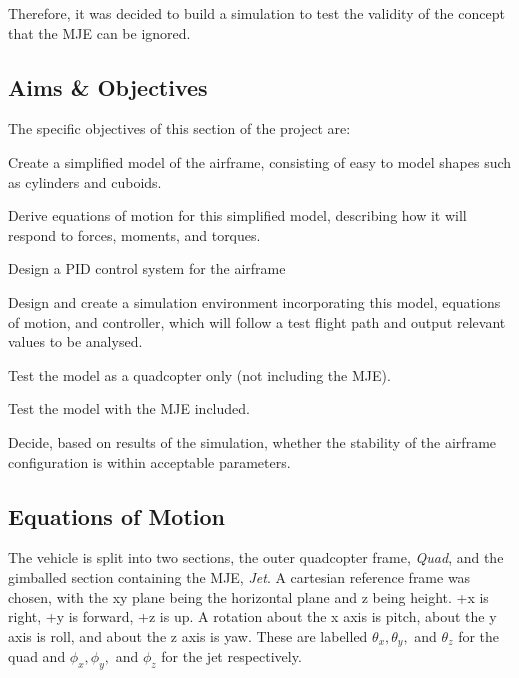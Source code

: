 \documentclass[11pt,twoside]{article}
\begin{document}
Therefore, it was decided to build a simulation to test the validity of the concept that the MJE can be ignored.

\subsection{Aims \& Objectives} \label{simulation objectives}
The specific objectives of this section of the project are:
\begin{compactenum}
    \item Create a simplified model of the airframe, consisting of easy to model shapes such as cylinders and cuboids.
    \item Derive equations of motion for this simplified model, describing how it will respond to forces, moments, and torques.
    \item Design a PID control system for the airframe
    \item Design and create a simulation environment incorporating this model, equations of motion, and controller, which will follow a test flight path and output relevant values to be analysed.
    \item Test the model as a quadcopter only (not including the MJE).
    \item Test the model with the MJE included.
    \item Decide, based on results of the simulation, whether the stability of the airframe configuration is within acceptable parameters.
\end{compactenum}

\subsection{Equations of Motion}

The vehicle is split into two sections, the outer quadcopter frame, \emph{Quad}, and the gimballed section containing the MJE, \emph{Jet}. A cartesian reference frame was chosen, with the xy plane being the horizontal plane and z being height. +x is right, +y is forward, +z is up. A rotation about the x axis is pitch, about the y axis is roll, and about the z axis is yaw. These are labelled $\theta_x, \theta_y,$ and $\theta_z$ for the quad and $\phi_x, \phi_y,$ and $\phi_z$ for the jet respectively.
\end{document}
